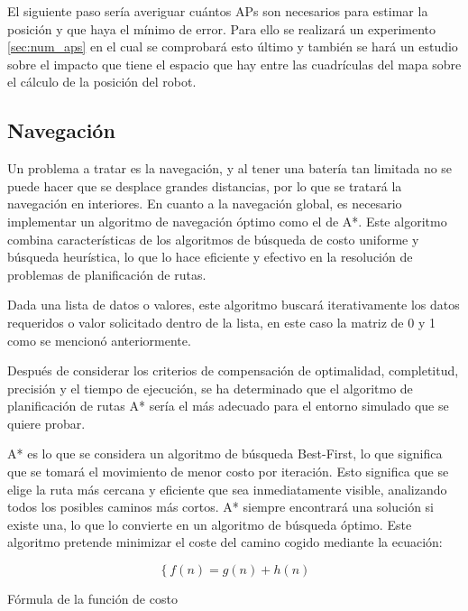 El siguiente paso sería averiguar cuántos APs son necesarios para estimar la posición y que haya el mínimo de error. Para ello se realizará un experimento \ref{sec:num_aps} en el cual se comprobará esto último y también se hará un estudio sobre el impacto que tiene el espacio que hay entre las cuadrículas del mapa sobre el cálculo de la posición del robot.


\subsection{Navegación}
\label{subsec:navegación}

Un problema a tratar es la navegación, y al tener una batería tan limitada no se puede hacer que se desplace grandes distancias, por lo que se tratará la navegación en interiores. En cuanto a la navegación global, es necesario implementar un algoritmo de navegación óptimo como el de A*. Este algoritmo combina características de los algoritmos de búsqueda de costo uniforme y búsqueda heurística, lo que lo hace eficiente y efectivo en la resolución de problemas de planificación de rutas. 

Dada una lista de datos o valores, este algoritmo buscará iterativamente los datos requeridos o
valor solicitado dentro de la lista, en este caso la matriz de 0 y 1 como se mencionó anteriormente. 

Después de considerar los criterios de compensación de optimalidad, completitud, precisión y el tiempo de ejecución, se ha determinado que el algoritmo de planificación de rutas A*
sería el más adecuado para el entorno simulado que se quiere probar. 


A* es lo que se considera un algoritmo de búsqueda Best-First, lo que significa que se tomará el movimiento de menor costo por iteración. Esto significa que se elige la ruta más cercana y eficiente que sea inmediatamente visible, analizando todos los posibles caminos más cortos. A* siempre encontrará una solución si existe una, lo que lo convierte en un algoritmo de búsqueda óptimo. Este algoritmo pretende minimizar el coste del camino cogido mediante la ecuación:


\begin{myequation}[H]
\begin{equation}
\left\{
	f(n) = g(n) + h(n)
\right.
\label{ec:ec6}
\end{equation}
\caption[Fórmula de la función de costo]{Fórmula de la función de costo}
\end{myequation}


